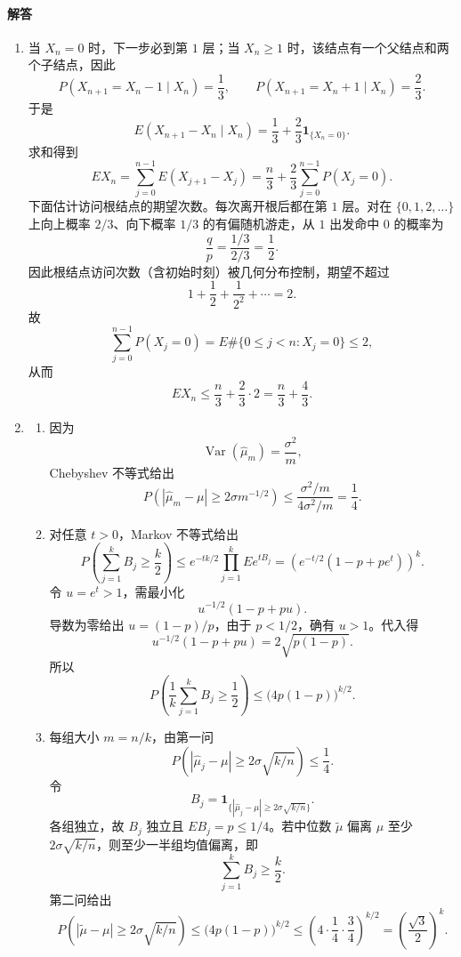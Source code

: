 \documentclass[UTF8,12pt]{ctexart}
\begin{document}
\paragraph{解答}
\begin{enumerate}[label=\textbf{\arabic*.},leftmargin=2.2em]
\item 当 \(X_n=0\) 时，下一步必到第 \(1\) 层；当 \(X_n\ge1\) 时，该结点有一个父结点和两个子结点，因此
\[
P(X_{n+1}=X_n-1\mid X_n)=\frac13,\qquad
P(X_{n+1}=X_n+1\mid X_n)=\frac23.
\]
于是
\[
E(X_{n+1}-X_n\mid X_n)=\frac13+\frac23\mathbf 1_{\{X_n=0\}}.
\]
求和得到
\[
E X_n=\sum_{j=0}^{n-1}E(X_{j+1}-X_j)
=\frac n3+\frac23\sum_{j=0}^{n-1}P(X_j=0).
\]
下面估计访问根结点的期望次数。每次离开根后都在第 \(1\) 层。对在 \(\{0,1,2,\ldots\}\) 上向上概率 \(2/3\)、向下概率 \(1/3\) 的有偏随机游走，从 \(1\) 出发命中 \(0\) 的概率为
\[
\frac{q}{p}=\frac{1/3}{2/3}=\frac12.
\]
因此根结点访问次数（含初始时刻）被几何分布控制，期望不超过
\[
1+\frac12+\frac1{2^2}+\cdots=2.
\]
故
\[
\sum_{j=0}^{n-1}P(X_j=0)=E\#\{0\le j<n:X_j=0\}\le2,
\]
从而
\[
E X_n\le \frac n3+\frac23\cdot2=\frac n3+\frac43.
\]

\item
\begin{enumerate}[label=\textbf{(\arabic*)},leftmargin=2.4em]
\item 因为
\[
\operatorname{Var}(\widehat\mu_m)=\frac{\sigma^2}{m},
\]
Chebyshev 不等式给出
\[
P\left(|\widehat\mu_m-\mu|\ge 2\sigma m^{-1/2}\right)
\le \frac{\sigma^2/m}{4\sigma^2/m}=\frac14.
\]
\item 对任意 \(t>0\)，Markov 不等式给出
\[
P\left(\sum_{j=1}^k B_j\ge \frac k2\right)
\le e^{-tk/2}\prod_{j=1}^k E e^{tB_j}
=\left(e^{-t/2}(1-p+pe^t)\right)^k.
\]
令 \(u=e^t>1\)，需最小化
\[
u^{-1/2}(1-p+pu).
\]
导数为零给出 \(u=(1-p)/p\)，由于 \(p<1/2\)，确有 \(u>1\)。代入得
\[
u^{-1/2}(1-p+pu)=2\sqrt{p(1-p)}.
\]
所以
\[
P\left(\frac1k\sum_{j=1}^k B_j\ge\frac12\right)
\le \bigl(4p(1-p)\bigr)^{k/2}.
\]
\item 每组大小 \(m=n/k\)，由第一问
\[
P\left(|\widehat\mu_j-\mu|\ge 2\sigma\sqrt{k/n}\right)\le\frac14.
\]
令
\[
B_j=\mathbf 1_{\{|\widehat\mu_j-\mu|\ge 2\sigma\sqrt{k/n}\}}.
\]
各组独立，故 \(B_j\) 独立且 \(E B_j=p\le1/4\)。若中位数 \(\widetilde\mu\) 偏离 \(\mu\) 至少 \(2\sigma\sqrt{k/n}\)，则至少一半组均值偏离，即
\[
\sum_{j=1}^k B_j\ge \frac k2.
\]
第二问给出
\[
P\left(|\widetilde\mu-\mu|\ge 2\sigma\sqrt{k/n}\right)
\le \bigl(4p(1-p)\bigr)^{k/2}
\le \left(4\cdot\frac14\cdot\frac34\right)^{k/2}
=\left(\frac{\sqrt3}{2}\right)^k.
\]
\end{enumerate}


\end{enumerate}
\end{document}
